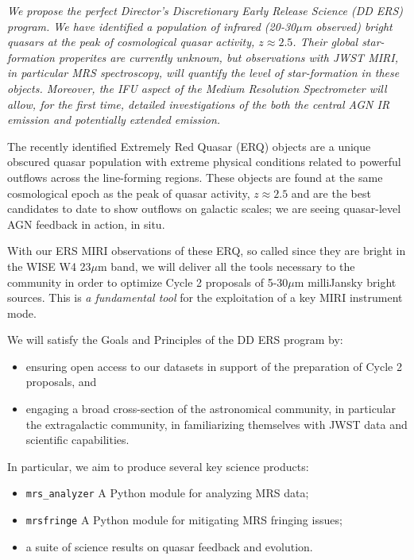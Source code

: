 \smallskip \smallskip
\noindent
{\it We propose the perfect Director’s Discretionary Early Release Science (DD ERS) program.
We have identified a population of infrared (20-30$\mu$m observed) bright quasars at the peak 
of cosmological quasar activity, $z\approx2.5$. 
Their global star-formation properites are currently unknown, but observations with JWST MIRI, 
in particular MRS spectroscopy, will quantify the level of star-formation in these objects. 
Moreover, the IFU aspect of the Medium Resolution Spectrometer will allow, for the first time, 
detailed investigations of the both the central AGN IR emission and potentially extended emission.


\smallskip \smallskip
\noindent
The recently identified Extremely Red Quasar (ERQ) objects are a
unique obscured quasar population with extreme physical conditions
related to powerful outflows across the line-forming regions. These
objects are found at the same cosmological epoch as the peak of quasar
activity, $z\approx2.5$ and are the best candidates to date to show
outflows on galactic scales; we are seeing quasar-level AGN feedback
in action, in situ. 

With our ERS MIRI observations of these ERQ, so called since they are
bright in the WISE W4 23$\mu$m band, we will deliver all the tools
necessary to the community in order to optimize Cycle 2 proposals of
5-30$\mu$m milliJansky bright sources. This is {\it a fundamental
tool} for the exploitation of a key MIRI instrument mode.

\noindent
We will satisfy the Goals and Principles of the DD ERS program by:
\begin{itemize}
\item ensuring open access to our datasets in support of the preparation of Cycle 2 proposals, and
\item engaging a broad cross-section of the astronomical community, in particular the extragalactic community, in familiarizing themselves with JWST data and scientific capabilities.
\end{itemize}

\noindent
In particular, we aim to produce several key science products:
\begin{itemize}
\item {\tt mrs\_analyzer} A Python module for analyzing MRS data; 
\item {\tt mrsfringe} A Python module for mitigating MRS fringing issues; 
\item a suite of science results on quasar feedback and evolution. 
\end{itemize}

}
